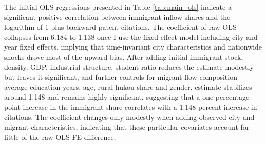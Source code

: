\documentclass[12pt]{article}
\begin{document}
The initial OLS regressions presented in Table \ref{tab:main_ols} indicate a significant positive correlation between immigrant inflow shares and the logarithm of 1 plus backward patent citations. The coefficient of raw OLS collapses from 6.184 to 1.138 once I use the fixed effect model including city and year fixed effects, implying that time-invariant city characteristics and nationwide shocks drove most of the upward bias. 
After adding initial immigrant stock, density, GDP, industrial structure, student ratio reduces the estimate modestly but leaves it significant, and further controls for migrant-flow composition average education years, age, rural-hukou share and gender, estimate stabilizes around 1.148 and remains highly significant, suggesting that a one-percentage-point increase in the immigrant share correlates with a 1.148 percent increase in citations. The coefficient changes only modestly when adding observed city and migrant characteristics, indicating that these particular covariates account for little of the raw OLS-FE difference. 
\end{document}
